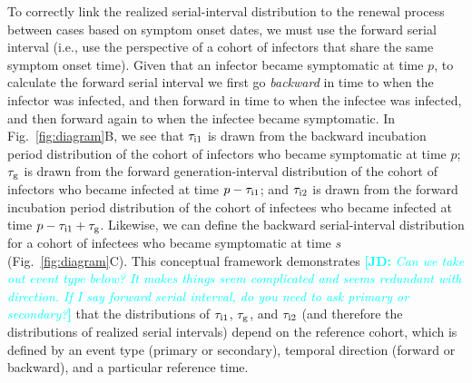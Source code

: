 \documentclass[12pt]{article}
\newcommand{\comment}{\showcomment}
\newcommand{\showcomment}[3]{\textcolor{#1}{\textbf{[#2: }\textsl{#3}\textbf{]}}}
\newcommand{\jd}[1]{\comment{cyan}{JD}{#1}}
\newcommand{\fref}[1]{Fig.~\ref{fig:#1}}
\newcommand{\psymp}{\ensuremath{p}} %
\newcommand{\ssymp}{\ensuremath{s}} %
\newcommand{\gtime}{\tau_{\rm g}} %
\begin{document}
To correctly link the realized serial-interval distribution to the renewal process
between cases based on symptom onset dates, we must use the forward
serial interval (i.e., use the perspective of a cohort of infectors
that share the same symptom onset time).  Given that an infector
became symptomatic at time $\psymp$, to calculate the forward serial
interval we first go \emph{backward} in time to when the infector was
infected, and then forward in time to when the infectee was infected,
and then forward again to when the infectee became symptomatic.
In \fref{diagram}B, we see that $\tau_{\rm i1}$ is drawn from
the backward incubation period distribution of the cohort
of infectors who became symptomatic at time $\psymp$; $\gtime$ is drawn from
the forward generation-interval distribution of the cohort of
infectors who became infected at time $\psymp - \tau_{\rm i1}$; and $\tau_{\rm i2}$
is drawn from the forward incubation period distribution of the cohort of
infectees who became infected at time $\psymp - \tau_{\rm i1} + \gtime$.
Likewise, we can define the backward serial-interval distribution for
a cohort of infectees who became symptomatic at time $\ssymp$
(\fref{diagram}C).  This conceptual framework demonstrates
\jd{Can we take out event type below? It makes things seem complicated and seems redundant with direction. If I say forward serial interval, do you need to ask primary or secondary?}
that the distributions of $\tau_{\rm i1}$, $\gtime$, and $\tau_{\rm i2}$ (and therefore the distributions of realized serial intervals) depend on the
reference cohort, which is defined by an event type (primary or secondary),
temporal direction (forward or backward), and a particular reference time.
\end{document}
